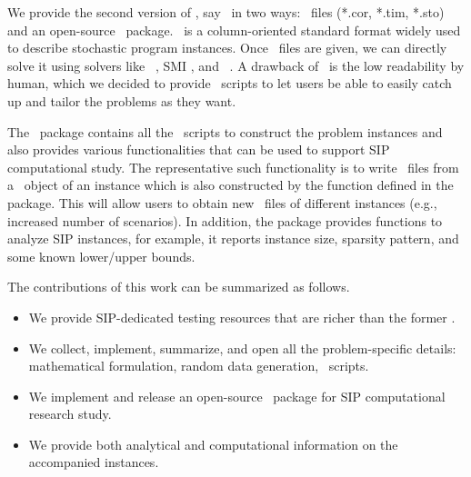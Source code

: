We provide the second version of \siplib, say \siplibtwo\ in two ways: \smps\ files (*.cor, *.tim, *.sto) \cite{smps} and an open-source \julia\ package. \smps\ is a column-oriented standard format widely used to describe stochastic program 
instances. Once \smps\ files are given, we can directly solve it using solvers like \dsp\ 
\cite{web:DSP}, \textsf{SMI} \cite{web:SMI}, and \scip\ \cite{SCIP}. A drawback of \smps\ is the low 
readability by human, which we decided to provide \julia\ scripts to let users be able to easily catch up and tailor the problems as they want.

The \julia\ package contains all the \julia\ scripts to construct the problem instances and also provides various functionalities that can be used to support SIP computational study. The representative such functionality is to write \smps\ files from a \julia\ object of an instance which is also constructed by the function defined in the package. This will allow users to obtain new \smps\ files of different instances (e.g., increased number of scenarios). In addition, the package provides functions to analyze SIP instances, for example, it reports instance size, sparsity pattern, and some known lower/upper bounds.

The contributions of this work can be summarized as follows.
\begin{itemize}
	\item We provide SIP-dedicated testing resources that are richer than the former \siplib.
	\item We collect, implement, summarize, and open all the problem-specific details: 
	mathematical formulation, random data generation, \julia\ scripts.
	\item We implement and release an open-source \julia\ package for SIP computational research study.
	\item We provide both analytical and computational information on the accompanied 
	instances.
\end{itemize}

